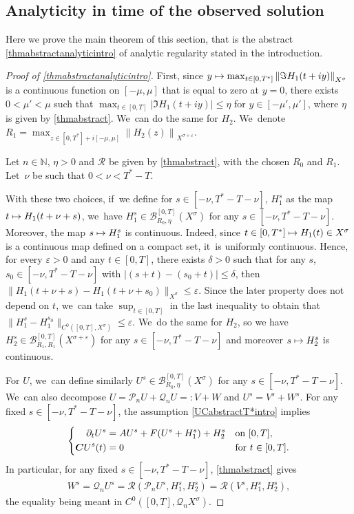 \documentclass[10pt]{amsart}
\newcommand\mto{\mathchoice{\longmapsto}{\mapsto}{\mapsto}{\mapsto}}
\theoremstyle{definition}
\let\mc\mathcal
\let\veps\varepsilon
\newcommand{\B}{\mc{B}}
\newcommand{\N}{\mathbb{N}}
\newcommand{\Q}{\mathcal{Q}}
\renewcommand{\P}{\mathcal{P}}
\newcommand{\bC}{\boldsymbol{C}}
\providecommand{\norm}[1]{\lVert#1\rVert}
\newcommand\nor[2]{\left\|#1\right\|_{#2}}
\begin{document}
\subsection{Analyticity in time of the observed solution} Here we prove the main theorem of this section, that is the abstract \cref{thmabstractanalyticintro} of analytic regularity stated in the introduction.
\begin{proof}[Proof of \cref{thmabstractanalyticintro}]
First, since $y\mto \max_{t\in [0,T^{*}]}\nor{\Im H_{1}(t+iy)}{X^{\sigma}}$ is a continuous function on $[-\mu,\mu]$ that is equal to zero at $y=0$, there exists $0<\mu'<\mu$ such that $\max_{t\in [0,T]}\left|\Im H_{1}(t+iy)\right| \leq \eta$ for $y\in [-\mu',\mu']$, where $\eta$ is given by \cref{thmabstract}. We~can do the same for $H_{2}$. We~denote $R_{1}=\max_{z\in [0,T^{*}]+i[-\mu,\mu]}\nor{H_{2}(z)}{X^{\sigma+\veps}}$.

Let $n\in \N$, $\eta>0$ and $\mathcal{R}$ be given by \cref{thmabstract}, with the chosen $R_0$ and $R_{1}$. Let~$\nu$ be such that $0<\nu<T^*-T$.

With these two choices, if~we define for $s\in [-\nu, T^*-T-\nu]$, $H_{1}^{s}$ as the map $t\mto H_{1}(t+\nu+s)$, we~have $H_{1}^{s} \in \B_{R_{0},\eta}^{[0,T]}(X^{\sigma})$ for any $s\in [-\nu, T^*-T-\nu]$. Moreover, the map $s\mto H_1^s$ is continuous. Indeed, since $t\in [0, T^*]\mto H_1(t)\in X^\sigma$ is a continuous map defined on a compact set, it~is uniformly continuous. Hence, for every $\veps>0$ and any $t\in [0, T]$, there exists $\delta>0$ such that for any $s$, $s_0\in [-\nu, T^*-T-\nu]$ with $|(s+t)-(s_0+t)|\leq \delta$, then $\norm{H_1(t+\nu+s)-H_1(t+\nu+s_0)}_{X^\sigma}\leq \veps$. Since the later property does not depend on $t$, we~can take $\sup_{t\in [0, T]}$ in the last inequality to obtain that $\norm{H_1^s-H_1^{s_0}}_{C^0([0, T], X^\sigma)}\leq \veps$. We~do the same for $H_2$, so we have $H_2^s\in \B_{R_{1},R_{1}}^{[0,T]}(X^{\sigma+\veps})$ for any $s\in [-\nu, T^*-T-\nu]$ and moreover $s\mto H_2^s$ is continuous.

For $U$, we~can define similarly $U^s\in \B_{R_{0},\eta}^{[0,T]}(X^{\sigma})$ for any $s\in [-\nu, T^*-T-\nu]$. We~can also decompose $U=\P_n U+\Q_n U=:V+W$ and $U^s=V^s+W^s$. For any fixed $s\in [-\nu, T^*-T-\nu]$, the assumption \eqref{UCabstractT*intro} implies
\begin{align}\label{UCabstractwiths}
\left\{\begin{aligned}
\partial_t U^s&=AU^s+F(U^s+H_{1}^s)+H_{2}^s&& \textnormal{on } [0,T],\\
\bC U^s(t)&=0 &&\textnormal{for }t\in [0,T].
\end{aligned}\right.
\end{align}
In particular, for any fixed $s\in [-\nu, T^*-T-\nu]$, \cref{thmabstract} gives
\begin{align}
\label{equalWs}
W^s=\Q_n U^s=\mathcal{R}(\P_{n}U^s,H_{1}^s,H_{2}^s)=\mathcal{R}(V^s,H_{1}^s,H_{2}^s),
\end{align} the equality being meant in $C^0([0,T], \Q_n X^{\sigma})$.


\end{proof}
\end{document}
